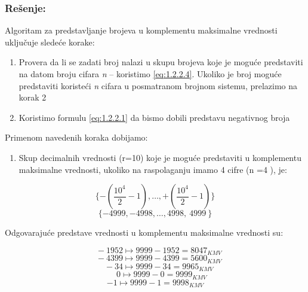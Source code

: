 \documentclass[a4paper,11pt]{article}
\numberwithin{equation}{section}
\begin{document}
\subsubsection*{Rešenje:}


Algoritam za predstavljanje brojeva u komplementu maksimalne vrednosti uključuje sledeće korake:



\begin{enumerate}[label=\arabic*),start=1,leftmargin=*]
\item Provera da li se zadati broj nalazi u skupu brojeva koje je moguće predstaviti na datom broju cifara \emph{n} – koristimo \eqref{eq:1.2.2.4}. Ukoliko je broj moguće predstaviti koristeći \emph{n} cifara u posmatranom brojnom sistemu, prelazimo na korak 2

\item Koristimo formulu \eqref{eq:1.2.2.1} da bismo dobili predstavu negativnog broja

\end{enumerate}


Primenom navedenih koraka dobijamo:



\begin{enumerate}[label=\alph*),start=1,leftmargin=*]
\item Skup decimalnih vrednosti (r=10) koje je moguće predstaviti u komplementu maksimalne vrednosti, ukoliko na raspolaganju imamo 4 cifre (n =4 ), je:

\end{enumerate}


\begin{equation}\label{eq:2.4.1}
\{ - \left( \frac{10^{4}}{2} - 1 \right),\ldots, + \left( \frac{10^{4}}{2} - 1 \right)\}
\end{equation}
\begin{equation}\label{eq:2.4.2}
\{ - 4999, - 4998,\ldots,4998,\ 4999\ \}
\end{equation}


Odgovarajuće predstave vrednosti u komplementu maksimalne vrednosti su:



\begin{equation}\label{eq:2.4.3}
\ \ \ \  - 1952 \longmapsto 9999 - 1952 = 8047_{KMV}
\end{equation}
\begin{equation}\label{eq:2.4.4}
\ \ \ \  - 4399 \longmapsto 9999 - 4399 = 5600_{KMV}
\end{equation}
\begin{equation}\label{eq:2.4.5}
\ \ \ \  - 34 \longmapsto 9999 - 34 = 9965_{KMV}
\end{equation}
\begin{equation}\label{eq:2.4.6}
\ \ \ \ \ \ \ 0 \longmapsto 9999 - 0 = 9999_{KMV}
\end{equation}
\begin{equation}\label{eq:2.4.7}
-1 \longmapsto 9999 - 1 = 9998_{KMV}
\end{equation}
\end{document}
